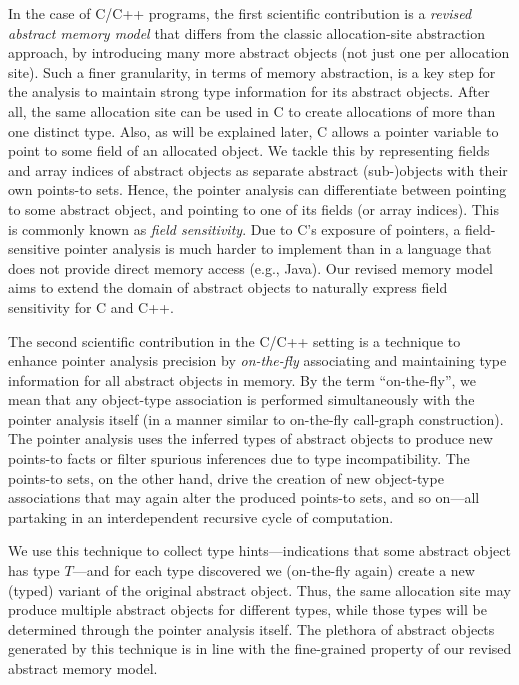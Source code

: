 In the case of C/C++ programs, the first scientific contribution is a
\emph{revised abstract memory model} that differs from the classic
allocation-site abstraction approach, by introducing many more
abstract objects (not just one per allocation site). Such a finer
granularity, in terms of memory abstraction, is a key step for the
analysis to maintain strong type information for its abstract
objects. After all, the same allocation site can be used in C to
create allocations of more than one distinct type. Also, as will be
explained later, C allows a pointer variable to point to some field of
an allocated object. We tackle this by representing fields and array
indices of abstract objects as separate abstract (sub-)objects with
their own points-to sets. Hence, the pointer analysis can
differentiate between pointing to some abstract object, and pointing
to one of its fields (or array indices). This is commonly known as
\emph{field sensitivity}. Due to C's exposure of pointers, a
field-sensitive pointer analysis is much harder to implement than in
a language that does not provide direct memory access (e.g., Java). Our
revised memory model aims to extend the domain of abstract objects to
naturally express field sensitivity for C and C++.

The second scientific contribution in the C/C++ setting
is a technique to enhance pointer analysis precision by
\emph{on-the-fly} associating and maintaining type information for all
abstract objects in memory.  By the term ``on-the-fly'', we mean that
any object-type association is performed simultaneously with the
pointer analysis itself (in a manner similar to on-the-fly
call-graph construction). The pointer analysis uses the inferred types
of abstract objects to produce new points-to facts or filter spurious
inferences due to type incompatibility. The points-to sets, on the
other hand, drive the creation of new object-type associations that
may again alter the produced points-to sets, and so on---all partaking
in an interdependent recursive cycle of computation.

We use this technique to collect type hints---indications that some
abstract object has type \(T\)---and for each type discovered we
(on-the-fly again) create a new (typed) variant of the original
abstract object. Thus, the same allocation site may produce multiple
abstract objects for different types, while those types will be
determined through the pointer analysis itself. The
plethora of abstract objects generated by this technique is in line
with the fine-grained property of our revised abstract memory model.

